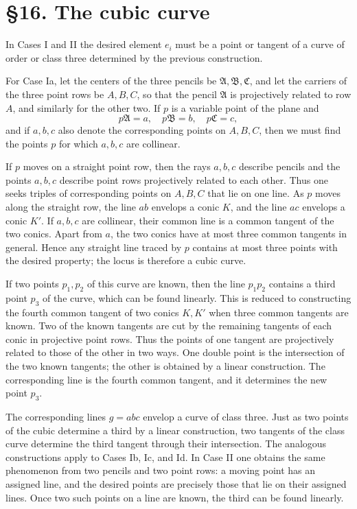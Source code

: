 \documentclass[11pt]{article}
\begin{document}
\section*{\S 16. The cubic curve}
In Cases I and II the desired element $e_i$ must be a point or tangent of a curve of order or class three determined by the previous construction.

For Case Ia, let the centers of the three pencils be $\mathfrak A,\mathfrak B,\mathfrak C$, and let the carriers of the three point rows be $A,B,C$, so that the pencil $\mathfrak A$ is projectively related to row $A$, and similarly for the other two. If $p$ is a variable point of the plane and
\[
p\mathfrak A=a,
\quad p\mathfrak B=b,
\quad p\mathfrak C=c,
\]
and if $a,b,c$ also denote the corresponding points on $A,B,C$, then we must find the points $p$ for which $a,b,c$ are collinear.

If $p$ moves on a straight point row, then the rays $a,b,c$ describe pencils and the points $a,b,c$ describe point rows projectively related to each other. Thus one seeks triples of corresponding points on $A,B,C$ that lie on one line. As $p$ moves along the straight row, the line $ab$ envelops a conic $K$, and the line $ac$ envelops a conic $K'$. If $a,b,c$ are collinear, their common line is a common tangent of the two conics. Apart from $a$, the two conics have at most three common tangents in general. Hence any straight line traced by $p$ contains at most three points with the desired property; the locus is therefore a cubic curve.

If two points $p_1,p_2$ of this curve are known, then the line $p_1p_2$ contains a third point $p_3$ of the curve, which can be found linearly. This is reduced to constructing the fourth common tangent of two conics $K,K'$ when three common tangents are known. Two of the known tangents are cut by the remaining tangents of each conic in projective point rows. Thus the points of one tangent are projectively related to those of the other in two ways. One double point is the intersection of the two known tangents; the other is obtained by a linear construction. The corresponding line is the fourth common tangent, and it determines the new point $p_3$.

The corresponding lines $g=abc$ envelop a curve of class three. Just as two points of the cubic determine a third by a linear construction, two tangents of the class curve determine the third tangent through their intersection. The analogous constructions apply to Cases Ib, Ic, and Id. In Case II one obtains the same phenomenon from two pencils and two point rows: a moving point has an assigned line, and the desired points are precisely those that lie on their assigned lines. Once two such points on a line are known, the third can be found linearly.
\end{document}
